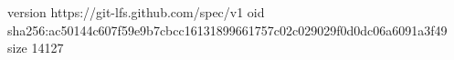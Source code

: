 version https://git-lfs.github.com/spec/v1
oid sha256:ac50144c607f59e9b7cbcc16131899661757c02c029029f0d0dc06a6091a3f49
size 14127
